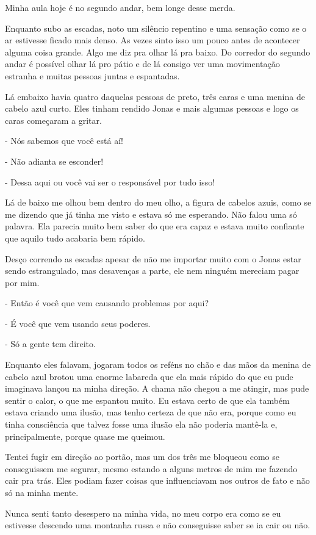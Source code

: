 Minha aula hoje é no segundo andar, bem longe desse merda.

Enquanto subo as escadas, noto um silêncio repentino e uma sensação como se o ar estivesse ficado mais denso. As vezes sinto isso um pouco antes de acontecer alguma coisa grande. Algo me diz pra olhar lá pra baixo. Do corredor do segundo andar é possível olhar lá pro pátio e de lá consigo ver uma movimentação estranha e muitas pessoas juntas e espantadas.

Lá embaixo havia quatro daquelas pessoas de preto, três caras e uma menina de cabelo azul curto. Eles tinham rendido Jonas e mais algumas pessoas e logo os caras começaram a gritar.

- Nós sabemos que você está aí!

- Não adianta se esconder!

- Dessa aqui ou você vai ser o responsável por tudo isso!

Lá de baixo me olhou bem dentro do meu olho, a figura de cabelos azuis, como se me dizendo que já tinha me visto e estava só me esperando. Não falou uma só palavra. Ela parecia muito bem saber do que era capaz e estava muito confiante que aquilo tudo acabaria bem rápido.

Desço correndo as escadas apesar de não me importar muito com o Jonas estar sendo estrangulado, mas desavenças a parte, ele nem ninguém mereciam pagar por mim.

- Então é você que vem causando problemas por aqui?

- É você que vem usando seus poderes.

- Só a gente tem direito.

Enquanto eles falavam, jogaram todos os reféns no chão e das mãos da menina de cabelo azul brotou uma enorme labareda que ela mais rápido do que eu pude imaginava lançou na minha direção. A chama não chegou a me atingir, mas pude sentir o calor, o que me espantou muito. Eu estava certo de que ela também estava criando uma ilusão, mas tenho certeza de que não era, porque como eu tinha consciência que talvez fosse uma ilusão ela não poderia mantê-la e, principalmente, porque quase me queimou.

Tentei fugir em direção ao portão, mas um dos três me bloqueou como se conseguissem me segurar, mesmo estando a alguns metros de mim me fazendo cair pra trás. Eles podiam fazer coisas que influenciavam nos outros de fato e não só na minha mente.

Nunca senti tanto desespero na minha vida, no meu corpo era como se eu estivesse descendo uma montanha russa e não conseguisse saber se ia cair ou não. 

